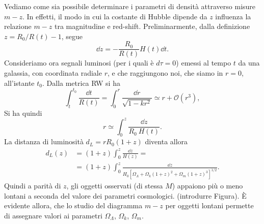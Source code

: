 Vediamo come sia possibile determinare i parametri di densità attraverso misure
$m-z$.  In effetti, il modo in cui la costante di Hubble dipende da $z$
influenza la relazione $m-z$ tra magnitudine e red-shift.  Preliminarmente,
dalla definizione $z=R_0/R(t) -1$, segue
\begin{equation}
  \dd z = -\frac {R_0}{R(t)} H(t) \dd t.
\end{equation}
Consideriamo ora segnali luminosi (per i quali è $d \tau=0$) emessi al tempo $t$
da una galassia, con coordinata radiale $r$, e che raggiungono noi, che siamo in
$r=0$, all'istante $t_0$.  Dalla metrica RW si ha
\begin{equation}
  \int_t^{t_0} \frac {\dd t}{R(t)}= \int_0^{r} \frac {\dd r}{\sqrt{1-kr^2}}
  \simeq r + \mathcal{O}(r^3),
\end{equation}
Si ha quindi
\begin{equation}
  r \simeq \int_0^z \frac{\dd z}{R_0 ~ H(t)}.
\end{equation}
La distanza di luminosità $d_L = r R_0 (1+z)$ diventa allora
\begin{equation}
  \begin{split}
    d_L(z) & = (1+z) \int_0^z \frac{\dd z}{H(z)} = \\
           & = (1+z) \int_0^z \frac{\dd z}{H_0
             \left[\Omega_{\Lambda}+\Omega_{k}(1+z)^2+\Omega_m
               (1+z)^3\right]^{1/2}}.
  \end{split}
\end{equation}
Quindi a parità di $z$, gli oggetti osservati (di stessa $M$) appaiono più o
meno lontani a seconda del valore dei parametri cosmologici. (introdurre
Figura).  È evidente allora, che lo studio del diagramma $m-z$ per oggetti
lontani permette di assegnare valori ai parametri $\Omega_{\Lambda}$,
$\Omega_{k}$, $\Omega_{m}$.

